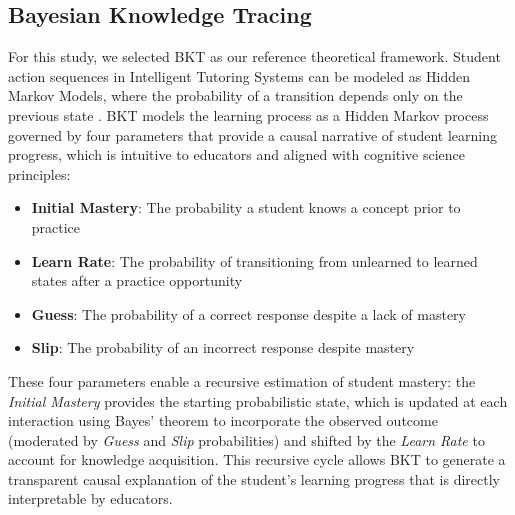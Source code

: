 \documentclass[applsci,article,submit,moreauthors,pdftex]{Definitions/mdpi}
\begin{document}

\subsection{Bayesian Knowledge Tracing} \label{sec_bkt}

For this study, we selected BKT \citep{corbett1994knowledge} as our reference theoretical framework. Student action sequences in Intelligent Tutoring Systems can be modeled as Hidden Markov Models, where the probability of a transition depends only on the previous state \citep{Arnau-Gonzalez2025195}. BKT models the learning process as a Hidden Markov process governed by four parameters that provide a causal narrative of student learning progress, which is intuitive to educators and aligned with cognitive science principles:

\begin{itemize}
    \item \textbf{Initial Mastery}: The probability a student knows a concept prior to practice 
    \item \textbf{Learn Rate}: The probability of transitioning from unlearned to learned states after a practice opportunity
    \item \textbf{Guess}: The probability of a correct response despite a lack of mastery
    \item \textbf{Slip}: The probability of an incorrect response despite mastery 
\end{itemize}

These four parameters enable a recursive estimation of student mastery: the \textit{Initial Mastery} provides the starting probabilistic state, which is updated at each interaction using Bayes' theorem to incorporate the observed outcome (moderated by \textit{Guess} and \textit{Slip} probabilities) and shifted by the \textit{Learn Rate} to account for knowledge acquisition. This recursive cycle allows BKT to generate a transparent causal explanation of the student's learning progress that is directly interpretable by educators.
\end{document}
